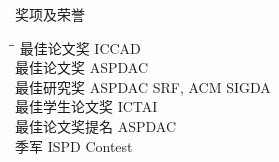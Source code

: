 
\begin{rSection}{奖项及荣誉}
\begin{tabbing}
\hspace{3.2in}\= \hspace{2.8in}\=\kill
    最佳论文奖                   \>ICCAD                         \\  
    
    最佳论文奖                   \>ASPDAC                         \\  

    最佳研究奖      \> ASPDAC SRF, ACM SIGDA        \\

    最佳学生论文奖                     \>ICTAI                         \\   
    
    最佳论文奖提名                  \>ASPDAC                         \\  
    
    季军                 \> ISPD Contest        \\



\end{tabbing}
\end{rSection}

